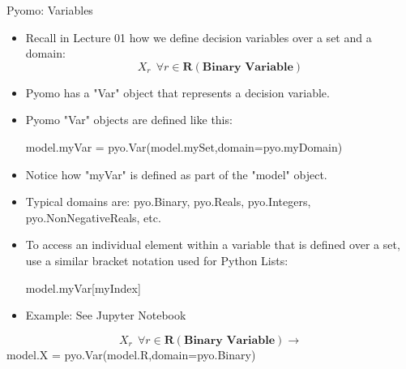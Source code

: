 \documentclass[10pt, aspectratio=169]{beamer}
\begin{document}
\begin{frame}{Pyomo: Variables}
    \begin{itemize}
        \item Recall in Lecture 01 how we define decision variables over a set and a domain:
        $$X_r \ \ \forall r \in \textbf{R} \left(\textbf{Binary\ Variable}\right)$$
        \item Pyomo has a "Var" object that represents a decision variable.
        \item Pyomo "Var" objects are defined like this:
        
        \hspace{0.25cm} model.myVar = pyo.Var(model.mySet,domain=pyo.myDomain)
        \item Notice how "myVar" is defined as part of the "model" object.
        \item Typical domains are: pyo.Binary, pyo.Reals, pyo.Integers, pyo.NonNegativeReals, etc.
        \item To access an individual element within a variable that is defined over a set, use a similar bracket notation used for Python Lists:
        
        \hspace{0.25cm} model.myVar[myIndex]

        \item Example: See Jupyter Notebook
    \end{itemize}
    \begin{center}
        $$X_r \ \ \forall r \in \textbf{R} \left(\textbf{Binary\ Variable}\right) \rightarrow $$ model.X = pyo.Var(model.R,domain=pyo.Binary)
    \end{center}
\end{frame}
\end{document}
